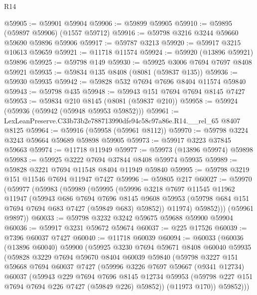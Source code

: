 \begin{lexlean}{R14}
\begin{coremodule}
@59905 := @59901 @59904
@59906 := @59899 @59905
@59910 := @59895 (@59897 @59906) (@1557 @59712)
@59916 := @59798 @3216 @3244 @59660 @59690 @59896 @59906
@59917 := @59787 @3213
@59920 := @59917 @3215 @10613 @59659
@59921 := @11718 @11574
@59924 := @59920 (@13896 @59921) @59896
@59925 := @59798 @149
@59930 := @59925 @3006 @7694 @7697 @8408 @59921
@59935 := @59834 @135 @8408 (@8081 (@59837 @135))
@59936 := @59930 @59935
@59942 := @59828 @532 @7694 @7696 @8404 @11574 @59840
@59943 := @59798 @435
@59948 := @59943 @151 @7694 @7694 @8145 @7427
@59953 := @59834 @210 @8145 (@8081 (@59837 @210))
@59958 := @59924 (@59936 (@59942 (@59948 @59953 @59852)))
@59961 := LexLeanPreserve.C33b73b2e788713990dfe94c58c97a86e.R14.__rel_65 @8407 @8125
@59964 := @59916 (@59958 (@59961 @8112))
@59970 := @59798 @3224 @3243 @59664 @59689 @59898 @59905
@59973 := @59917 @3223 @37845 @59663
@59974 := @11718 @11949
@59977 := @59973 (@13896 @59974) @59898
@59983 := @59925 @3222 @7694 @37844 @8408 @59974 @59935
@59989 := @59828 @3221 @7694 @11548 @8404 @11949 @59840
@59995 := @59798 @3219 @151 @11546 @7694 @11947 @7427
@59996 := @59805 @217
@60027 := @59970
    (@59977
      (@59983
        (@59989
          (@59995
            (@59996
              @3218
              @7697
              @11545
              @11962
              @11947
              (@59943
                @686
                @7694
                @7696
                @8145
                @9608
                @59953
                (@59798 @684 @151 @7694 @7694 @683 @7427 (@59849 @683) @59852))
              @11974)
            @59852)))
      (@59961 @9897))
@60033 := @59798 @3232 @3242 @59675 @59688 @59900 @59904
@60036 := @59917 @3231 @59672 @59674
@60037 := @225 @17526
@60039 := @7396 @60037 @7427
@60040 := @11718 @60039
@60094 := @60033
    (@60036
      (@13896 @60040)
      @59900
      (@59925
        @3230
        @7694
        @59671
        @8408
        @60040
        @59935
        (@59828
          @3229
          @7694
          @59670
          @8404
          @60039
          @59840
          (@59798
            @3227
            @151
            @59668
            @7694
            @60037
            @7427
            (@59996
              @3226
              @7697
              @59667
              (@9341 @12734)
              @60037
              (@59943
                @229
                @7694
                @7696
                @8145
                @12734
                @59953
                (@59798 @227 @151 @7694 @7694 @226 @7427 (@59849 @226) @59852))
              (@11973 @170))
            @59852)))

\end{coremodule}
\end{lexlean}

